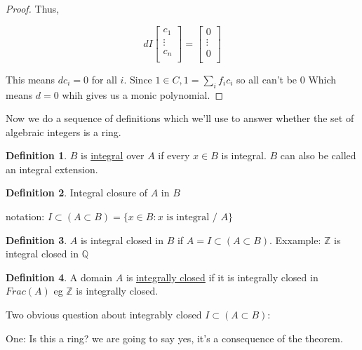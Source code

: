 \documentclass{article}
\theoremstyle{definition}
\newtheorem{definition}{Definition}
\begin{document}
\begin{proof}
    Thus,

    \[
        dI \begin{bmatrix}
             c_1 \\
             \vdots \\
             c_n \\
        \end{bmatrix} = \begin{bmatrix}
             0 \\
             \vdots \\
             0 \\
        \end{bmatrix}
    \]

    This means \(dc_i = 0\) for all \(i\). Since \(1\in C, 1 = \sum_{i} f_i c_i\) so all can't be \(0\) Which means \(d = 0\) whih gives us a monic polynomial.

\end{proof}

Now we do a sequence of definitions which we'll use to answer whether the set of algebraic integers is a ring.

\begin{definition}
    \(B\) is \underline{integral} over \(A\) if every \(x\in B\) is integral. \(B\) can also be called an integral extension.
\end{definition}

\begin{definition}
    Integral closure of \(A\) in \(B\) 

    notation: \(I \subset (A \subset B) = \{ x\in B : x \text{ is integral / } A \} \) 

\end{definition}

\begin{definition}
    \(A\) is integral closed in \(B\) if \(A = I \subset (A \subset B)\). Exxample: \(\mathbb{Z}\) is integral closed in \(\mathbb{Q}\) 
\end{definition}

\begin{definition}
    A domain \(A\) is \underline{integrally closed} if it is integrally closed in \(Frac(A)\) eg \(\mathbb{Z}\) is integrally closed.
\end{definition}

Two obvious question about integrably closed \(I \subset (A \subset B)\):

One: Is this a ring? we are going to say yes, it's a consequence of the theorem.
\end{document}

